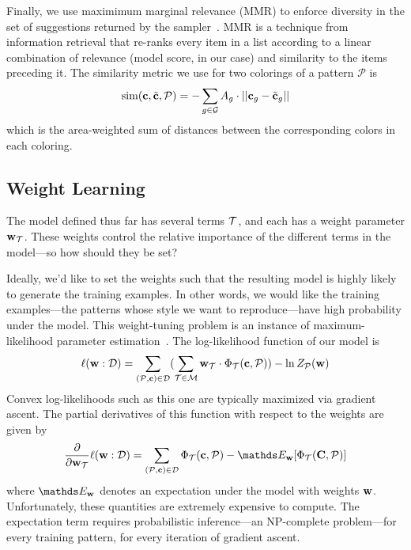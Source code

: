 Finally, we use maximimum marginal relevance (MMR) to enforce diversity in the set of suggestions returned by the sampler~\cite{MMR}. MMR is a technique from information retrieval that re-ranks every item in a list according to a linear combination of relevance (model score, in our case) and similarity to the items preceding it. The similarity metric we use for two colorings of a pattern $\mathcal{P}$ is
\begin{equation*}
\text{sim}(\mathbf{c}, \tilde{\mathbf{c}}, \mathcal{P}) = - \sum_{g \in \mathcal{G}} {A_g \cdot ||\mathbf{c}_g - \tilde{\mathbf{c}}_g||}
\end{equation*}
which is the area-weighted sum of \lab distances between the corresponding colors in each coloring.

\subsection{Weight Learning}
\label{sec:weights}

The model defined thus far has several terms $\mathcal{T}$, and each has a weight parameter $\mathbf{w}_{\mathcal{T}}$. These weights control the relative importance of the different terms in the model---so how should they be set?

Ideally, we'd like to set the weights such that the resulting model is highly likely to generate the training examples. In other words, we would like the training examples---the patterns whose style we want to reproduce---have high probability under the model. This weight-tuning problem is an instance of maximum-likelihood parameter estimation~\cite{PGMBook}. The log-likelihood function of our model is
\begin{equation*}
\ell(\mathbf{w} : \mathcal{D}) =
	\sum_{(\mathcal{P}, \mathbf{c}) \in \mathcal{D}}
	(
		\sum_{\mathcal{T} \in \mathcal{M}}
			\mathbf{w}_{\mathcal{T}} \cdot \Phi_{\mathcal{T}}(\mathbf{c}, \mathcal{P})
	)			
		- \ln{Z_{\mathcal{P}}(\mathbf{w})}
\end{equation*}
Convex log-likelihoods such as this one are typically maximized via gradient ascent. The partial derivatives of this function with respect to the weights are given by
\begin{equation*}
\frac{\partial}{\partial \weights_\term} \ell(\weights : \dataset) = 
	\sum_{(\pattern, \colors) \in \dataset}
			\termStats(\colors, \pattern)
		- \expectation_\weights[\termStats(\colorVars, \pattern)]
\end{equation*}
where $\expectation_\weights$ denotes an expectation under the model with weights $\mathbf{w}$. Unfortunately, these quantities are extremely expensive to compute. The expectation term requires probabilistic inference---an NP-complete problem---for every training pattern, for every iteration of gradient ascent.

